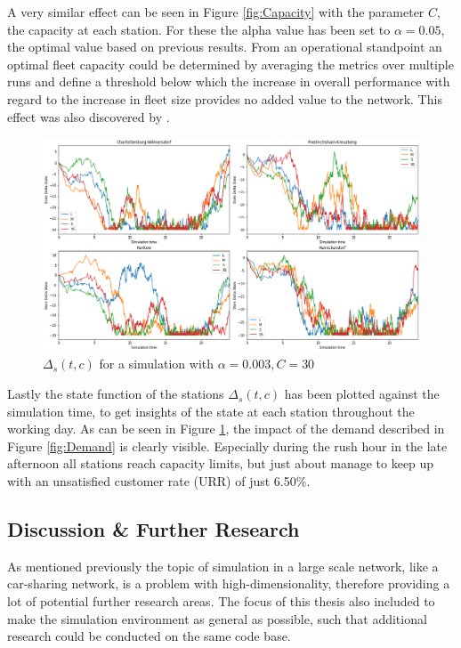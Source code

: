 A very similar effect can be seen in Figure \ref{fig:Capacity} with the parameter $C$,
the capacity at each station. For these the alpha value has been set to $\alpha = 0.05$,
the optimal value based on previous results. From an operational standpoint an optimal
fleet capacity could be determined by averaging the metrics over multiple runs
and define a threshold below which the increase in overall performance with regard to the
increase in fleet size provides no added value to the network. This effect was also discovered
by .

\begin{figure}[htbp]
  \centering
  \includegraphics[width=\linewidth]{./Figures/delta-func.png}
  \caption{$\Delta_s(t, c)$ for a simulation with $\alpha=0.003, C=30$}
  \label{fig:DeltaFunc}
\end{figure}

Lastly the state function of the stations $\Delta_s(t, c)$ has been plotted against the
simulation time, to get insights of the state at each station throughout the working day.
As can be seen in Figure \ref{fig:DeltaFunc}, the impact of the demand described in Figure \ref{fig:Demand}
is clearly visible. Especially during the rush hour in the late afternoon all stations
reach capacity limits, but just about manage to keep up with an unsatisfied customer rate (URR)
of just 6.50\%. 

\subsection{Discussion \& Further Research}
\label{sub_sec:Results/Discussion}

As mentioned previously the topic of simulation in a large scale network, like a car-sharing network,
is a problem with high-dimensionality, therefore providing a lot of potential further research areas.
The focus of this thesis also included to make the simulation environment as general 
as possible, such that additional research could be conducted on the same code base.

